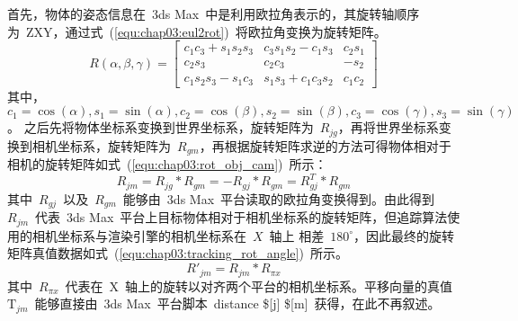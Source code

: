 首先，物体的姿态信息在~3ds Max~中是利用欧拉角表示的，其旋转轴顺序为~ZXY，通过式~(\ref{equ:chap03:eul2rot})~将欧拉角变换为旋转矩阵。
\begin{equation}
  \label{equ:chap03:eul2rot}
  R(\alpha, \beta, \gamma)=\left[   
  \begin{matrix}
    c_1c_3+s_1s_2s_3 & c_3s_1s_2-c_1s_3 & c_2s_1\\
    c_2s_3 & c_2c_3 & -s_2 \\
    c_1s_2s_3-s_1c_3 & s_1s_3+c_1c_3s_2 & c_1c_2
  \end{matrix}
  \right]
\end{equation}
其中，$c_1=\cos(\alpha),s_1=\sin(\alpha), c_2=\cos(\beta),s_2=\sin(\beta), c_3=\cos(\gamma),s_3=\sin(\gamma)$。
之后先将物体坐标系变换到世界坐标系，旋转矩阵为~$R_{jg}$，再将世界坐标系变换到相机坐标系，旋转矩阵为~$R_{gm}$，再根据旋转矩阵求逆的方法可得物体相对于相机的旋转矩阵如式~(\ref{equ:chap03:rot_obj_cam})~所示：
\begin{equation}
  \label{equ:chap03:rot_obj_cam}
  R_{jm} = R_{jg}*R_{gm} = -R_{gj}*R_{gm} = R_{gj}^{T}*R_{gm}
\end{equation}
其中~$R_{gj}$~以及~$R_{gm}$~能够由~3ds Max~平台读取的欧拉角变换得到。由此得到~$R_{jm}$~代表~3ds Max~平台上目标物体相对于相机坐标系的旋转矩阵，但追踪算法使用的相机坐标系与渲染引擎的相机坐标系在~$X$~轴上
相差~$180^\circ$，因此最终的旋转矩阵真值数据如式~(\ref{equ:chap03:tracking_rot_angle})~所示。
\begin{equation}
  \label{equ:chap03:tracking_rot_angle}
  R'_{jm} = R_{jm}*R_{\pi x}
\end{equation}
其中~$R_{\pi x}$~代表在~X~轴上的旋转以对齐两个平台的相机坐标系。平移向量的真值~$\textrm{T}_{jm}$~能够直接由~3ds Max~平台脚本~distance \$[j] \$[m]~获得，在此不再叙述。


